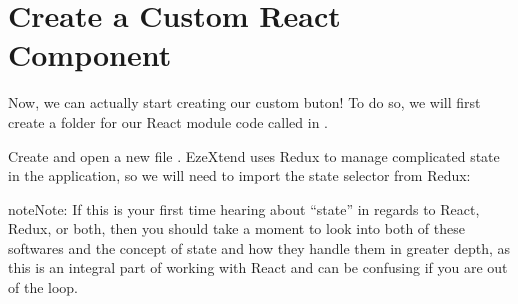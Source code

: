 \documentclass[letterpaper,10pt,english]{sphinxmanual}
\begin{document}
%
\begin{sphinxVerbatim}[commandchars=\\\{\},numbers=left,firstnumber=1,stepnumber=1]
\end{sphinxVerbatim}
\sphinxresetverbatimhllines

\sphinxstepscope


\section{Create a Custom React Component}
\label{\detokenize{custom_component/create_component:create-a-custom-react-component}}\label{\detokenize{custom_component/create_component::doc}}
\sphinxAtStartPar
Now, we can actually start creating our custom buton! To do so, we will first create a folder for our React module code called  in .

\sphinxAtStartPar
Create and open a new file . EzeXtend uses Redux to manage complicated state in the application, so we will need to import the state selector from Redux:

\begin{sphinxadmonition}{note}{Note:}
\sphinxAtStartPar
If this is your first time hearing about “state” in regards to React, Redux, or both, then you should take a moment to look into both of these softwares and the concept of state and how they handle them in greater depth, as this is an integral part of working with React and can be confusing if you are out of the loop.
\end{sphinxadmonition}
\end{document}
